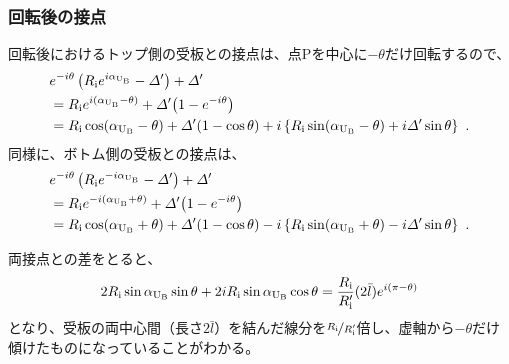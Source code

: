 \subsubsection{回転後の接点}
回転後におけるトップ側の受板との接点は、点Pを中心に$-\theta$だけ回転するので、
\begin{align*}
  &  e^{-i\theta}\left(R_\text ie^{i\alpha_{\text U_\text B}}-\varDelta'\right)+\varDelta'\\
  &= R_\text ie^{i(\alpha_{\text U_\text B}-\theta)}+\varDelta'\!\left(1-e^{-i\theta}\right)\\
  &= R_\text i\cos(\alpha_{\text U_\text B}-\theta)+\varDelta'(1-\cos\theta)
     +i\left\{R_\text i\sin(\alpha_{\text U_\text B}-\theta)+i\varDelta'\sin\theta\right\}\ .
\end{align*}
同様に、ボトム側の受板との接点は、
\begin{align*}
  &  e^{-i\theta}\left(R_\text ie^{-i\alpha_{\text U_\text B}}-\varDelta'\right)+\varDelta'\\
  &= R_\text ie^{-i(\alpha_{\text U_\text B}+\theta)}+\varDelta'\!\left(1-e^{-i\theta}\right)\\
  &= R_\text i\cos(\alpha_{\text U_\text B}+\theta)+\varDelta'(1-\cos\theta)
     -i\left\{R_\text i\sin(\alpha_{\text U_\text B}+\theta)-i\varDelta'\sin\theta\right\}\ .
\end{align*}
\begin{hosokubox}
両接点との差をとると、
\begin{align*}
  2R_\text i\sin\alpha_{\text U_\text B}\sin\theta+2iR_\text i\sin\alpha_{\text U_\text B}\cos\theta
  = \frac{R_\text i}{R_\text i'}(2\bar l)e^{i(\pi-\theta)}
\end{align*}
となり、受板の両中心間（長さ$2\bar l$）を結んだ線分を$\nicefrac{R_\text i}{R_\text i'}$倍し、虚軸から$-\theta$だけ傾けたものになっていることがわかる。
\end{hosokubox}




